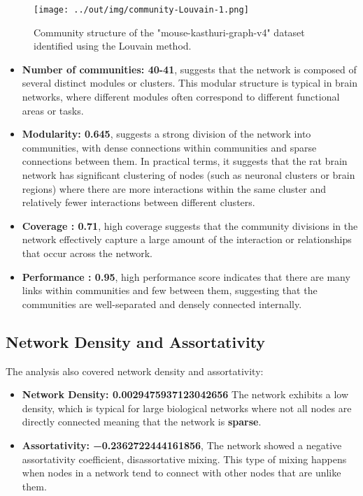 \documentclass[
	report, %
	11pt, %
]{CSUniSchoolLabReport}
\begin{document}
	\begin{figure}[H]
		\centering
		\captionsetup{justification=centering}
		\texttt{[image: ../out/img/community-Louvain-1.png]}
		\caption{Community structure of the "mouse-kasthuri-graph-v4" dataset identified using the Louvain method.}
		\label{fig:community}
	\end{figure}

	\begin{itemize}
		\item \textbf{Number of communities: 40-41}, suggests that the network is composed of several distinct modules or clusters. This modular structure is typical in brain networks, where different modules often correspond to different functional areas or tasks.
		\item \textbf{Modularity: 0.645}, suggests a strong division of the network into communities, with dense connections within communities and sparse connections between them. In practical terms, it suggests that the rat brain network has significant clustering of nodes (such as neuronal clusters or brain regions) where there are more interactions within the same cluster and relatively fewer interactions between different clusters.
		\item \textbf{Coverage : 0.71}, high coverage suggests that the community divisions in the network effectively capture a large amount of the interaction or relationships that occur across the network.
		\item \textbf{Performance : 0.95}, high performance score indicates that there are many links within communities and few between them, suggesting that the communities are well-separated and densely connected internally.
	\end{itemize}

	\subsection{Network Density and Assortativity}

	The analysis also covered network density and assortativity:
	\begin{itemize}
		\item \textbf{Network Density: \num{0.0029475937123042656}} The network exhibits a low density, which is typical for large biological networks where not all nodes are directly connected meaning that the network is \textbf{sparse}.
		\item \textbf{Assortativity: \num{-0.2362722444161856}}, The network showed a negative assortativity coefficient, disassortative mixing. This type of mixing happens when nodes in a network tend to connect with other nodes that are unlike them.
	\end{itemize}
\end{document}
